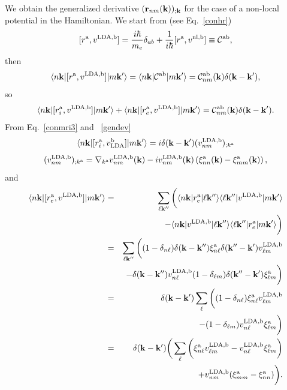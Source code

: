 \documentclass[floatfix,prb,aps,superscriptaddress,11pt,preprint]{revtex4}
\begin{document}
We obtain the generalized derivative $(\mathbf{r}_{nm}(\mathbf{k}))_{;\mathbf{k}}$ for
the case of a non-local potential in the Hamiltonian.
We start from (see Eq.~\eqref{conhr})
\begin{equation}\label{na_hrdab}
[r^{\mathrm{a}},v^{\mathrm{LDA},\mathrm{b}}]= 
\frac{i\hbar}{m_e}\delta_{ab}+
\frac{1}{i\hbar}[r^{\mathrm{a}},v^{\mathrm{nl},\mathrm{b}}]
\equiv
{\mathbf{\cal C}}^{\mathrm{a}\mathrm{b}}
,
\end{equation} 
then
\begin{equation}\label{na_hrdab2}
\langle n\mathbf{k} |[r^{\mathrm{a}},v^{\mathrm{LDA},\mathrm{b}}]| m\mathbf{k}' \rangle
=
\langle n\mathbf{k} |{\mathbf{\cal C}}^{\mathrm{a}\mathrm{b}}| m\mathbf{k}' \rangle
=
{\mathbf{\cal C}}^{\mathrm{a}\mathrm{b}}_{nm}(\mathbf{k})\delta(\mathbf{k}-\mathbf{k}')
,
\end{equation}
so
\begin{equation}\label{na_hrdab3}
\langle n\mathbf{k} |[r^{\mathrm{a}}_i,v^{\mathrm{LDA},\mathrm{b}}]| m\mathbf{k}' \rangle
+
\langle n\mathbf{k} |[r^{\mathrm{a}}_e,v^{\mathrm{LDA},\mathrm{b}}]| m\mathbf{k}' \rangle
=
{\mathbf{\cal C}}^{\mathrm{a}\mathrm{b}}_{nm}(\mathbf{k})\delta(\mathbf{k}-\mathbf{k}')
.
\end{equation}
From Eq.~\eqref{conmri3} and ~\eqref{gendev}
\begin{equation}\label{na_rip}
\langle n\mathbf{k} |[r^{\mathrm{a}}_i,v_{\mathrm{LDA}}^{\mathrm{b}}]| m\mathbf{k}' \rangle
=i\delta(\mathbf{k}-\mathbf{k}')(v_{nm}^{\mathrm{LDA},\mathrm{b}})_{;k^{\mathrm{a}}}
\end{equation}
\begin{equation}\label{na_ripn}
(v^{\mathrm{LDA},\mathrm{b}}_{nm})_{;k^{\mathrm{a}}}=
\nabla_{k^{\mathrm{a}}}
v^{\mathrm{LDA},\mathrm{b}}_{n m}(\mathbf{k})
-
i
v^{\mathrm{LDA},\mathrm{b}}_{nm}(\mathbf{k})
\left(
\xi^{\mathrm{a}}_{nn}(\mathbf{k})
-
\xi^{\mathrm{a}}_{mm}(\mathbf{k})
\right)
,
\end{equation}
and
\begin{eqnarray}\label{na_rep}
\langle n\mathbf{k} |[r^{\mathrm{a}}_e,v^{\mathrm{LDA},\mathrm{b}}]| m\mathbf{k}' \rangle&=&
\sum_{\ell\mathbf{k}''}
\bigg(
\langle n\mathbf{k} |r^{\mathrm{a}}_e| \ell\mathbf{k}'' \rangle\langle \ell\mathbf{k}'' |v^{\mathrm{LDA},\mathrm{b}}| m\mathbf{k}' \rangle
\nonumber \\
&&
-
\langle n\mathbf{k} |v^{\mathrm{LDA},\mathrm{b}}| \ell\mathbf{k}'' \rangle\langle \ell\mathbf{k}'' |r^{\mathrm{a}}_e| m\mathbf{k}' \rangle
\bigg)
\nonumber \\
&=&
\sum_{\ell\mathbf{k}''}
\bigg(
(1-\delta_{n\ell})\delta(\mathbf{k}-\mathbf{k}'')\xi^{\mathrm{a}}_{n\ell}
\delta(\mathbf{k}''-\mathbf{k}')v^{\mathrm{LDA},\mathrm{b}}_{\ell m}
\nonumber \\
&&-
\delta(\mathbf{k}-\mathbf{k}'')v^{\mathrm{LDA},\mathrm{b}}_{n\ell}
(1-\delta_{\ell m})\delta(\mathbf{k}''-\mathbf{k}')\xi^{\mathrm{a}}_{\ell m}
\bigg)
\nonumber \\
&=&
\delta(\mathbf{k}-\mathbf{k}')
\sum_{\ell}
\bigg(
(1-\delta_{n\ell})
\xi^{\mathrm{a}}_{n\ell}
v^{\mathrm{LDA},\mathrm{b}}_{\ell m}
\nonumber \\
&&-
(1-\delta_{\ell m})
v^{\mathrm{LDA},\mathrm{b}}_{n\ell}
\xi^{\mathrm{a}}_{\ell m}
\bigg)
\nonumber \\
&=&
\delta(\mathbf{k}-\mathbf{k}')
\bigg(
\sum_{\ell}
\bigg(
\xi^{\mathrm{a}}_{n\ell}
v^{\mathrm{LDA},\mathrm{b}}_{\ell m}
-
v^{\mathrm{LDA},\mathrm{b}}_{n\ell}
\xi^{\mathrm{a}}_{\ell m}
\bigg)
\nonumber \\
&&+
v^{\mathrm{LDA},\mathrm{b}}_{nm}(\xi^{\mathrm{a}}_{mm}
-
\xi^{\mathrm{a}}_{nn}
)
\bigg)
.
\end{eqnarray}
\end{document}
